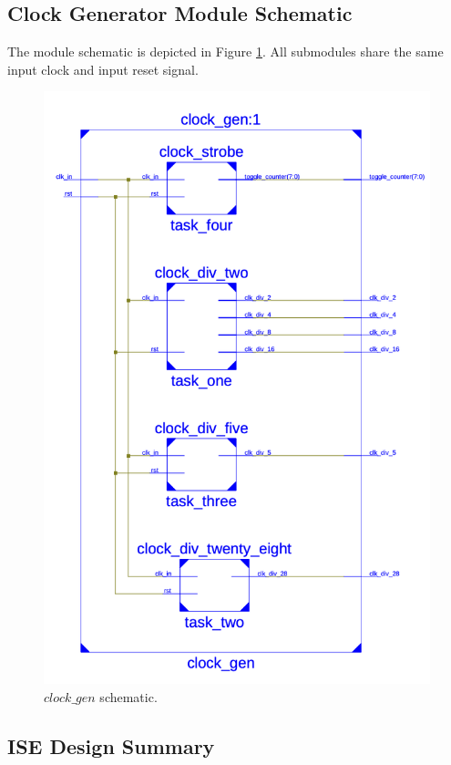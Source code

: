 \documentclass{article}
\begin{document}
\subsection{Clock Generator Module Schematic}
The module schematic is depicted in Figure \ref{fig:schem}. All submodules share the same input clock and input reset signal.
\begin{figure}[H]
    \centering
    \includegraphics[scale=0.6]{../figs/schematic.png}
    \caption{$clock\_gen$ schematic.}
    \label{fig:schem}
\end{figure}

\subsection{ISE Design Summary}

\end{document}
